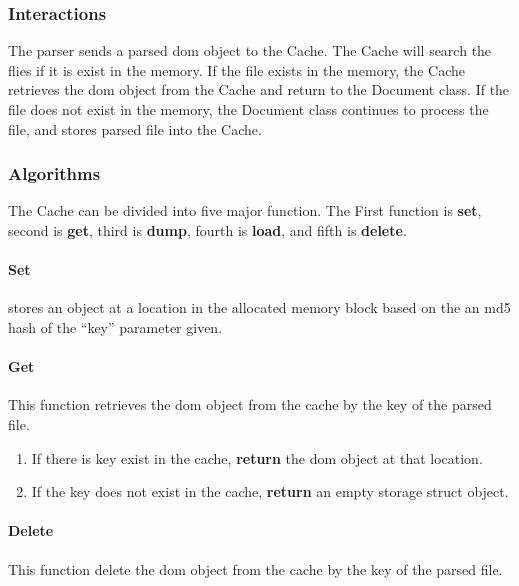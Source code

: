 \begin{enmerate}
\subsubsection{Interactions}

The parser sends a parsed \gls{dom} object to the Cache. 
The Cache will search the flies if it is exist in the memory. 
If the file exists in the memory, the Cache retrieves the \gls{dom} object from the Cache and return to the Document class. 
If the file does not exist in the memory, the Document class continues to process the file, and stores parsed file into the Cache.

\subsubsection{Algorithms}

The Cache can be divided into five major function.
The First function is \textbf{set}, second is \textbf{get}, third is \textbf{dump}, fourth is \textbf{load}, and fifth is \textbf{delete}.

\paragraph{Set} stores an object at a location in the allocated memory block based on the an \gls{md5} hash of the ``key'' parameter given.

\paragraph{Get} This function retrieves the \gls{dom} object from the cache by the key of the parsed file.

\begin{enumerate}
    \item If there is key exist in the cache, \textbf{return} the \gls{dom} object at that location.
    \item If the key does not exist in the cache, \textbf{return} an empty storage struct object.
\end{enumerate}

\paragraph{Delete} This function delete the \gls{dom} object from the cache by the key of the parsed file.


\end{enmerate}
